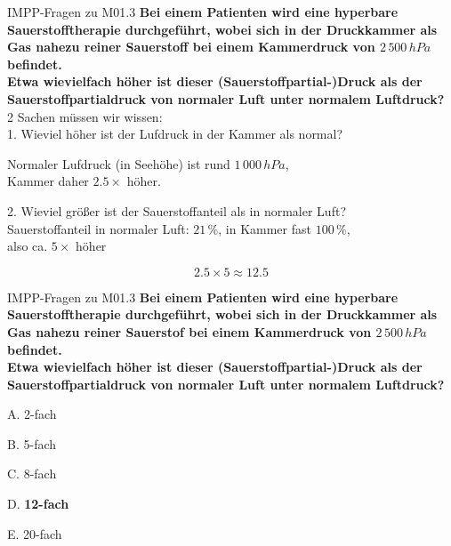 \documentclass{beamer}
\begin{document}
\begin{frame}{IMPP-Fragen zu M01.3}
    \textbf{Bei einem Patienten wird eine hyperbare Sauerstofftherapie durchgeführt, wobei sich in der Druckkammer als Gas nahezu reiner Sauerstoff bei einem Kammerdruck von \(2\,500\,hPa\) befindet. 
        } \\
        \textbf{
        Etwa wievielfach höher ist dieser (Sauerstoffpartial-)Druck als der Sauerstoffpartialdruck von normaler Luft unter normalem Luftdruck?
        }\\[0.2 cm]

2 Sachen müssen wir wissen: \\
1. Wieviel höher ist der Lufdruck in der Kammer als normal? \\ \pause

Normaler Lufdruck (in Seehöhe) ist rund \(1\,000\,hPa\), \\ Kammer daher \(2.5\times\) höher.

\pause

2. Wieviel größer ist der Sauerstoffanteil als in normaler Luft? \\

Sauerstoffanteil in normaler Luft: \(21\,\%\), in Kammer fast \(100\,\%\), \\ 
also ca. \(5\times\) höher \pause

\[2.5\times 5 \approx 12.5\]

\end{frame}


\begin{frame}{IMPP-Fragen zu M01.3}
    \textbf{Bei einem Patienten wird eine hyperbare Sauerstofftherapie durchgeführt, wobei sich in der Druckkammer als Gas nahezu reiner Sauerstof bei einem Kammerdruck von \(2\,500\,hPa\) befindet. 
        } \\
        \textbf{
        Etwa wievielfach höher ist dieser (Sauerstoffpartial-)Druck als der Sauerstoffpartialdruck von normaler Luft unter normalem Luftdruck?
        }\\[0.2 cm]

\begin{description}
\item{A.} 2-fach
\item{B.} 5-fach
\item{C.} 8-fach
\item{D.} \textcolor{theme}{\textbf{12-fach}} %
\item{E.} 20-fach

\end{description}
\end{frame}
\end{document}
